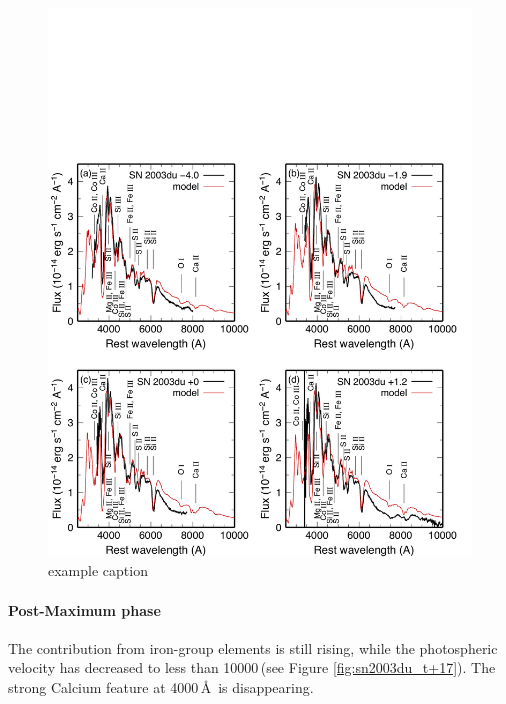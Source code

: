 \begin{figure}[htbp] %
   \centering
   \includegraphics[width=\textwidth]{chapter1/plots/sn2003du_t0.pdf} 
   \caption{example caption}
   \label{fig:sn2003du_t0}
\end{figure}

\paragraph{Post-Maximum phase}
The contribution from iron-group elements is still rising, while the photospheric velocity has decreased to less than 10000\,\kms (see Figure \ref{fig:sn2003du_t+17}). The strong Calcium feature at 4000\,\AA\ is disappearing. 

